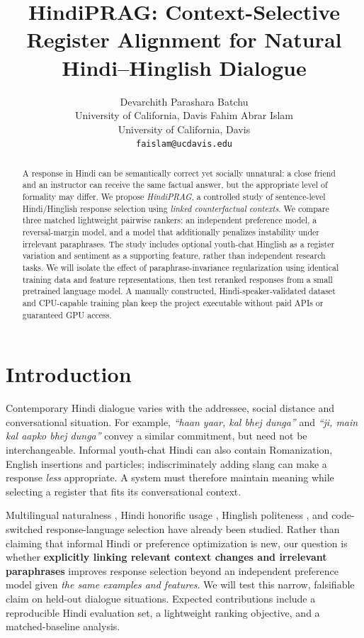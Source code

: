 \documentclass[11pt]{article}
\title{HindiPRAG: Context-Selective Register Alignment for Natural Hindi--Hinglish Dialogue}
\author{Devarchith Parashara Batchu \\
  University of California, Davis
  \And
  Fahim Abrar Islam \\
  University of California, Davis \\
  \texttt{faislam@ucdavis.edu}}
\begin{document}
\maketitle
\begin{abstract}
A response in Hindi can be semantically correct yet socially unnatural: a close friend and an instructor can receive the same factual answer, but the appropriate level of formality may differ. We propose \emph{HindiPRAG}, a controlled study of sentence-level Hindi/Hinglish response selection using \emph{linked counterfactual contexts}. We compare three matched lightweight pairwise rankers: an independent preference model, a reversal-margin model, and a model that additionally penalizes instability under irrelevant paraphrases. The study includes optional youth-chat Hinglish as a register variation and sentiment as a supporting feature, rather than independent research tasks. We will isolate the effect of paraphrase-invariance regularization using identical training data and feature representations, then test reranked responses from a small pretrained language model. A manually constructed, Hindi-speaker-validated dataset and CPU-capable training plan keep the project executable without paid APIs or guaranteed GPU access.
\end{abstract}

\section{Introduction}
Contemporary Hindi dialogue varies with the addressee, social distance and conversational situation. For example, \emph{``haan yaar, kal bhej dunga''} and \emph{``ji, main kal aapko bhej dunga''} convey a similar commitment, but need not be interchangeable. Informal youth-chat Hindi can also contain Romanization, English insertions and particles; indiscriminately adding slang can make a response \emph{less} appropriate. A system must therefore maintain meaning while selecting a register that fits its conversational context.

Multilingual naturalness \citep{guo2025accent}, Hindi honorific usage \citep{mukherjee2025honorific}, Hinglish politeness \citep{priya2024hingpoem}, and code-switched response-language selection \citep{oh2026ola} have already been studied. Rather than claiming that informal Hindi or preference optimization is new, our question is whether \textbf{explicitly linking relevant context changes and irrelevant paraphrases} improves response selection beyond an independent preference model given \emph{the same examples and features}. We will test this narrow, falsifiable claim on held-out dialogue situations. Expected contributions include a reproducible Hindi evaluation set, a lightweight ranking objective, and a matched-baseline analysis.
\end{document}
